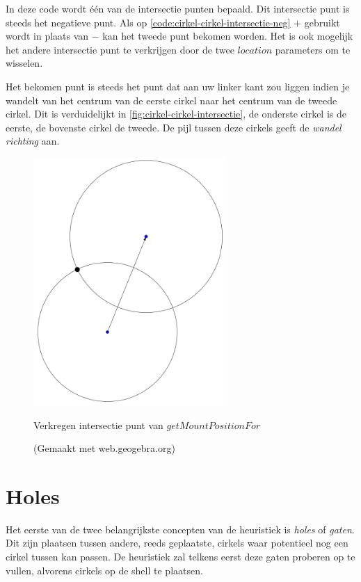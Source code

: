 \documentclass[12pt,a4paper,oneside]{book}
\begin{document}
In deze code wordt één van de intersectie punten bepaald.
Dit intersectie punt is steeds het negatieve punt.
Als op \autoref{code:cirkel-cirkel-intersectie-neg} $+$ gebruikt wordt in plaats van $-$ kan het tweede punt bekomen worden.
Het is ook mogelijk het andere intersectie punt te verkrijgen door de twee $location$ parameters om te wisselen.

Het bekomen punt is steeds het punt dat aan uw linker kant zou liggen indien je wandelt van het centrum van de eerste cirkel naar het centrum van de tweede cirkel.
Dit is verduidelijkt in \autoref{fig:cirkel-cirkel-intersectie}, de onderste cirkel is de eerste, de bovenste cirkel de tweede.
De pijl tussen deze cirkels geeft de \textit{wandel richting} aan.

\begin{figure}
  \centering
  \includegraphics[width=0.65\textwidth]{cirkel-cirkel-intersectie.png}
  \caption{Verkregen intersectie punt van $getMountPositionFor$} \label{fig:cirkel-cirkel-intersectie} 
  \caption*{(Gemaakt met web.geogebra.org)}
\end{figure}

\section{Holes} \label{sec:holes}

Het eerste van de twee belangrijkste concepten van de heuristiek is \textit{holes} of \textit{gaten}.
Dit zijn plaatsen tussen andere, reeds geplaatste, cirkels waar potentieel nog een cirkel tussen kan passen.
De heuristiek zal telkens eerst deze gaten proberen op te vullen, alvorens cirkels op de shell te plaatsen.
\end{document}
